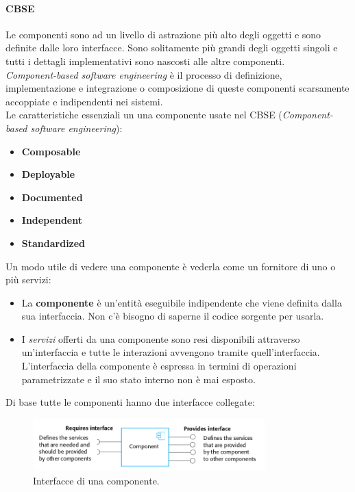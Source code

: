 	 	 	\paragraph{CBSE}
	 	 	Le componenti sono ad un livello di astrazione più alto degli oggetti e sono definite dalle loro interfacce. Sono solitamente più grandi degli oggetti singoli e tutti i dettagli implementativi sono nascosti alle altre componenti. \\
	 		\textit{Component-based software engineering} è il processo di definizione, implementazione e integrazione o composizione di queste componenti scarsamente accoppiate e indipendenti nei sistemi.  \\
	 		Le caratteristiche essenziali un una componente usate nel CBSE (\textit{Component-based software engineering}):
	 		\begin{itemize}
	 			\item \textbf{Composable}
	 			\item \textbf{Deployable}
	 			\item \textbf{Documented}
	 			\item \textbf{Independent}
	 			\item \textbf{Standardized}
	 		\end{itemize}
 			Un modo utile di vedere una componente è vederla come un fornitore di uno o più servizi:
 			\begin{itemize}
 				\item La \textbf{componente} è un'entità eseguibile indipendente che viene definita dalla sua interfaccia. Non c'è bisogno di saperne il codice sorgente per usarla.
 				\item I \textit{servizi} offerti da una componente sono resi disponibili attraverso un'interfaccia e tutte le interazioni avvengono tramite quell'interfaccia. L'interfaccia della componente è espressa in termini di operazioni parametrizzate e il suo stato interno non è mai esposto.
 			\end{itemize}
 			Di base tutte le componenti hanno due interfacce collegate:
 			
 			\begin{figure}[H]
 				\centering
 				\includegraphics[width=0.8\textwidth]{img/interfaces}		
 				\caption{Interfacce di una componente.}
 			\end{figure} 
 			
